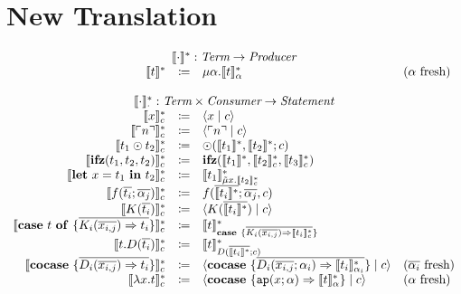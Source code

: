 \documentclass[nonacm]{acmart}
\newcommand{\lit}[1]{\ensuremath{\ulcorner #1 \urcorner}}
\newcommand{\cut}[2]{\ensuremath{\langle #1 \mid #2 \rangle}}
\newcommand{\ifz}[3]{\ensuremath{\mathbf{ifz}(#1, #2, #3)}}
\newcommand{\letin}[3]{\ensuremath{\mathbf{let}\ #1 = #2\ \mathbf{in}\ #3}}
\newcommand{\caseof}[2]{\ensuremath{\mathbf{case}\ #1\ \mathbf{of}\ \{ #2 \}}}
\newcommand{\case}[1]{\ensuremath{\mathbf{case}\ \{ #1 \}}}
\newcommand{\cocase}[1]{\ensuremath{\mathbf{cocase}\ \{ #1 \}}}
\newcommand{\translatestar}[2]{\ensuremath{\llbracket #1 \rrbracket_{#2}^{\ast}}}
\newcommand{\fresh}[1]{\ensuremath{(#1\text{ fresh})}}
\begin{document}
\section{New Translation}
\label{sec:new-translation}

\[
  \begin{array}{rcll}
    \multicolumn{4}{c}{\translatestar{\cdot}{} : \emph{Term} \rightarrow  \emph{Producer}}\\
    \translatestar{t}{} & \coloneqq & \mu\alpha.\translatestar{t}{\alpha} & \fresh{\alpha}\\
    \\
    \multicolumn{4}{c}{\translatestar{\cdot}{\cdot} : \emph{Term} \times \emph{Consumer} \rightarrow \emph{Statement}}\\
    \translatestar{x}{c} & \coloneq & \cut{x}{c} & \\
    \translatestar{\lit{n}}{c} & \coloneq & \cut{\lit{n}}{c} & \\
    \translatestar{t_1 \odot t_2}{c} & \coloneq & \odot(\translatestar{t_1}{}, \translatestar{t_2}{}; c) & \\
    \translatestar{\ifz{t_1}{t_2}{t_2}}{c} & \coloneq & \ifz{\translatestar{t_1}{}}{\translatestar{t_2}{c}}{\translatestar{t_3}{c}} & \\
    \translatestar{\letin{x}{t_1}{t_2}}{c} & \coloneq & \translatestar{t_1}{\tilde{\mu}x.\translatestar{t_2}{c}} & \\
    \translatestar{f(\overline{t_i}; \overline{\alpha_j})}{c} & \coloneq & f(\overline{\translatestar{t_i}{}}; \overline{\alpha_j}, c) & \\
    \translatestar{K(\overline{t_i})}{c} & \coloneq & \cut{K(\overline{\translatestar{t_i}{}})}{c} & \\
    \translatestar{\caseof{t}{\overline{K_i(\overline{x_{i,j}}) \Rightarrow t_i}}}{c} & \coloneq & \translatestar{t}{\case{\overline{K_i(\overline{x_{i,j}}) \Rightarrow \translatestar{t_i}{c}}}} & \\
    \translatestar{t.D(\overline{t_i})}{c} & \coloneq & \translatestar{t}{D(\overline{\translatestar{t_i}{}}; c)} & \\
    \translatestar{\cocase{\overline{D_i(\overline{x_{i,j}}) \Rightarrow t_i}}}{c} & \coloneq & \cut{\cocase{\overline{D_i(\overline{x_{i,j}}; \alpha_i) \Rightarrow \translatestar{t_i}{\alpha_i}}}}{c} & \fresh{\overline{\alpha_i}} \\
    \translatestar{\lambda x.t}{c} & \coloneq & \cut{\cocase{\mathtt{ap}(x; \alpha) \Rightarrow \translatestar{t}{\alpha}}}{c} & \fresh{\alpha} \\

\end{array}\]
\end{document}
